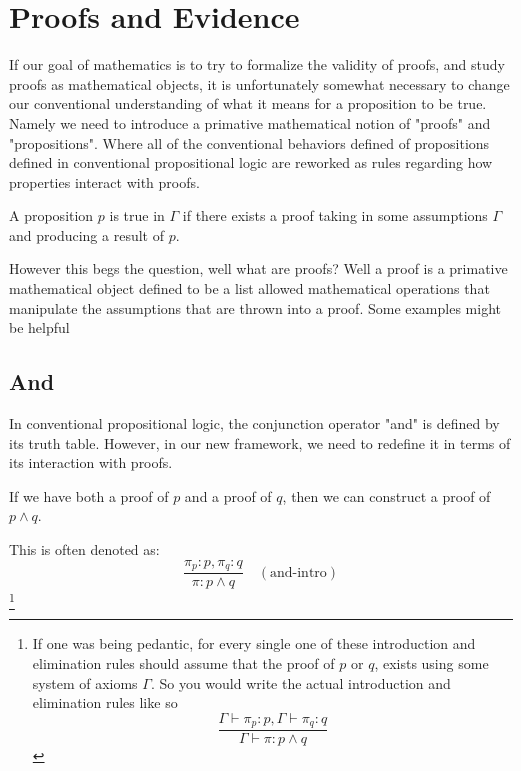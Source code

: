 \chapter{Proofs and Evidence}

If our goal of mathematics is to try to formalize the validity of proofs, and study proofs as mathematical objects, it is unfortunately somewhat necessary to change our conventional understanding of what it means for a proposition to be true. Namely we need to introduce a primative mathematical notion of "proofs" and "propositions". Where all of the conventional behaviors defined of propositions defined in conventional propositional logic are reworked as rules regarding how properties interact with proofs.

\begin{definition}[Truth]
    A proposition $p$ is true in $\Gamma$ if there exists a proof taking in some assumptions $\Gamma$ and producing a result of $p$.
\end{definition}
However this begs the question, well what are proofs? Well a proof is a primative mathematical object defined to be a list allowed mathematical operations that manipulate the assumptions that are thrown into a proof. Some examples might be helpful

\section{And}

In conventional propositional logic, the conjunction operator "and" is defined by its truth table. However, in our new framework, we need to redefine it in terms of its interaction with proofs.

\begin{definition}
    If we have both a proof of $p$ and a proof of $q$, then we can construct a proof of $p \land q$.
\end{definition}

This is often denoted as:
\begin{equation*}
    \frac{\pi_p : p, \pi_q : q}{\pi: p \land q}\quad(\text{and-intro})
\end{equation*} \footnote{If one was being pedantic, for every single one of these introduction and elimination rules should assume that the proof of $p$ or $q$, exists using some system of axioms $\Gamma$. So you would write the actual introduction and elimination rules like so $$\frac{ \Gamma \vdash \pi_p : p, \Gamma \vdash \pi_q : q}{ \Gamma \vdash \pi: p \land q}$$}


